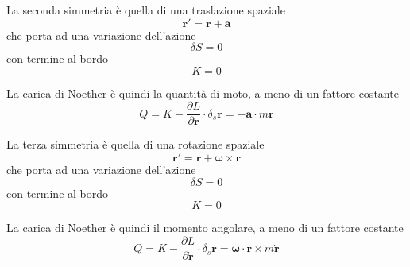 \begin{frame}  

    La seconda simmetria è quella di una traslazione spaziale 
    \begin{equation*}
        \mathbf r' = \mathbf r + \mathbf a
    \end{equation*}
    che porta ad una variazione dell'azione
    \begin{equation*}
        \delta S = 0
    \end{equation*}
    con termine al bordo 
    \begin{equation*}
        K = 0
    \end{equation*}
    
    La carica di Noether è quindi la quantità di moto, a meno di un fattore costante
    \begin{equation*}
        Q = K - \frac{\partial L}{\partial \mathbf{\dot r}} \cdot \delta_s \mathbf r = - \mathbf a \cdot m \mathbf{\dot r} 
    \end{equation*}

\end{frame}

\begin{frame}  

    La terza simmetria è quella di una rotazione spaziale 
    \begin{equation*}
        \mathbf r' = \mathbf r + \boldsymbol \omega \times \mathbf r
    \end{equation*}
    che porta ad una variazione dell'azione
    \begin{equation*}
        \delta S = 0
    \end{equation*}
    con termine al bordo 
    \begin{equation*}
        K = 0
    \end{equation*}
    
    La carica di Noether è quindi il momento angolare, a meno di un fattore costante
    \begin{equation*}
        Q = K - \frac{\partial L}{\partial \mathbf{\dot r}} \cdot \delta_s \mathbf r = \boldsymbol \omega \cdot \mathbf r \times m \mathbf{\dot r} 
    \end{equation*}

\end{frame}

